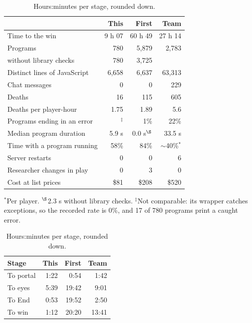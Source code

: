 \documentclass[11pt,a4paper]{article}
\begin{document}
\begin{table}[t]
  \begin{minipage}[t]{0.60\textwidth}
    \caption{The three runs' measures.}
    \label{tab:headline}
    \small
    \begin{tabularx}{\linewidth}{@{}Xrrr@{}}
      \toprule
      & \textbf{This} & \textbf{First} & \textbf{Team} \\
      \midrule
      Time to the win & 9 h 07 & 60 h 49 & 27 h 14 \\
      Programs & 780 & 5,879 & 2,783 \\
      \quad without library checks & 780 & 3,725 & \\
      Distinct lines of JavaScript & 6,658 & 6,637 & 63,313 \\
      Chat messages & 0 & 0 & 229 \\
      Deaths & 16 & 115 & 605 \\
      Deaths per player-hour & 1.75 & 1.89 & 5.6 \\
      Programs ending in an error & $^{\ddagger}$ & 1\% & 22\% \\
      Median program duration & 5.9 s & 0.0 s$^{\S}$ & 33.5 s \\
      Time with a program running & 58\% & 84\% & ${\sim}$40\%$^{*}$ \\
      Server restarts & 0 & 0 & 6 \\
      Researcher changes in play & 0 & 3 & 0 \\
      Cost at list prices & \$81 & \$208 & \$520 \\
      \bottomrule
    \end{tabularx}\par\vspace{3pt}
    {\footnotesize $^{*}$Per player. $^{\S}$2.3 s without library checks. $^{\ddagger}$Not comparable: its wrapper catches exceptions, so the recorded rate is 0\%, and 17 of 780 programs print a caught error.}
  \end{minipage}\hfill
  \begin{minipage}[t]{0.36\textwidth}
    \caption{Hours:minutes per stage, rounded down.}
    \label{tab:stages}
    \small
    \begin{tabularx}{\linewidth}{@{}Xrrr@{}}
      \toprule
      \textbf{Stage} & \textbf{This} & \textbf{First} & \textbf{Team} \\
      \midrule
      To portal & 1:22 & 0:54 & 1:42 \\
      To eyes & 5:39 & 19:42 & 9:01 \\
      To End & 0:53 & 19:52 & 2:50 \\
      To win & 1:12 & 20:20 & 13:41 \\
      \bottomrule
    \end{tabularx}
  \end{minipage}
\end{table}
\end{document}
